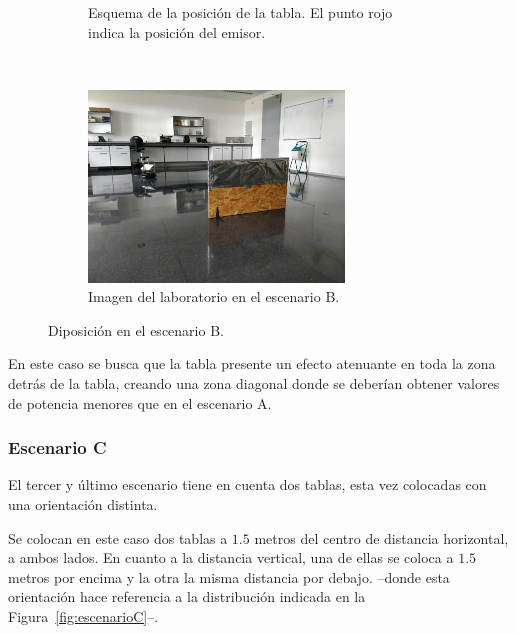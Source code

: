 \begin{figure}[H]
    \centering
    \begin{subfigure}[b]{0.45\textwidth}
        \centering
        
        \caption{Esquema de la posición de la tabla. El punto rojo indica la posición del emisor.}
    \end{subfigure}
    ~~
    \begin{subfigure}[b]{0.45\textwidth}
        \centering
        \includegraphics[width=6.8cm]{pic/escB.jpg}
        \caption{Imagen del laboratorio en el escenario B.}
    \end{subfigure}
    \caption{Diposición en el escenario B.}
    \label{fig:escenarioB}
\end{figure}

En este caso se busca que la tabla presente un efecto atenuante en toda la zona detrás de la tabla, creando una zona diagonal donde se deberían obtener valores de potencia menores que en el escenario A.

\subsubsection{Escenario C}

El tercer y último escenario tiene en cuenta dos tablas, esta vez colocadas con una orientación distinta.

Se colocan en este caso dos tablas a $1.5$ metros del centro de distancia horizontal, a ambos lados.
En cuanto a la distancia vertical, una de ellas se coloca a $1.5$ metros por encima y la otra la misma distancia por debajo. --donde esta orientación hace referencia a la distribución indicada en la Figura~\ref{fig:escenarioC}--.

